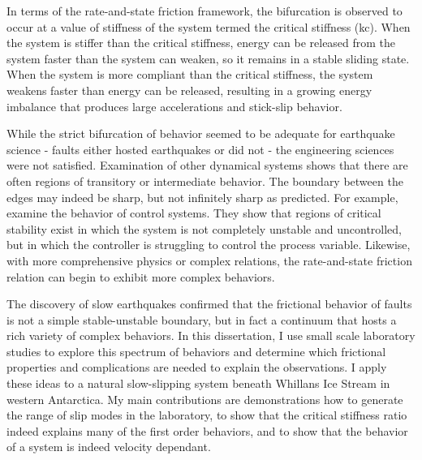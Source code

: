 In terms of the rate-and-state friction framework, the bifurcation is observed to occur at a value of stiffness of the system termed the critical stiffness (kc). When the system is stiffer than the critical stiffness, energy can be released from the system faster than the system can weaken, so it remains in a stable sliding state. When the system is more compliant than the critical stiffness, the system weakens faster than energy can be released, resulting in a growing energy imbalance that produces large accelerations and stick-slip behavior.  

While the strict bifurcation of behavior seemed to be adequate for earthquake science - faults either hosted earthquakes or did not - the engineering sciences were not satisfied. Examination of other dynamical systems shows that there are often regions of transitory or intermediate behavior. The boundary between the edges may indeed be sharp, but not infinitely sharp as predicted. For example, examine the behavior of control systems. They show that regions of critical stability exist in which the system is not completely unstable and uncontrolled, but in which the controller is struggling to control the process variable. Likewise, with more comprehensive physics or complex relations, the rate-and-state friction relation can begin to exhibit more complex behaviors. 

The discovery of slow earthquakes confirmed that the frictional behavior of faults is not a simple stable-unstable boundary, but in fact a continuum that hosts a rich variety of complex behaviors. In this dissertation, I use small scale laboratory studies to explore this spectrum of behaviors and determine which frictional properties and complications are needed to explain the observations. I apply these ideas to a natural slow-slipping system beneath Whillans Ice Stream in western Antarctica. My main contributions are demonstrations how to generate the range of slip modes in the laboratory, to show that the critical stiffness ratio indeed explains many of the first order behaviors, and to show that the behavior of a system is indeed velocity dependant.
